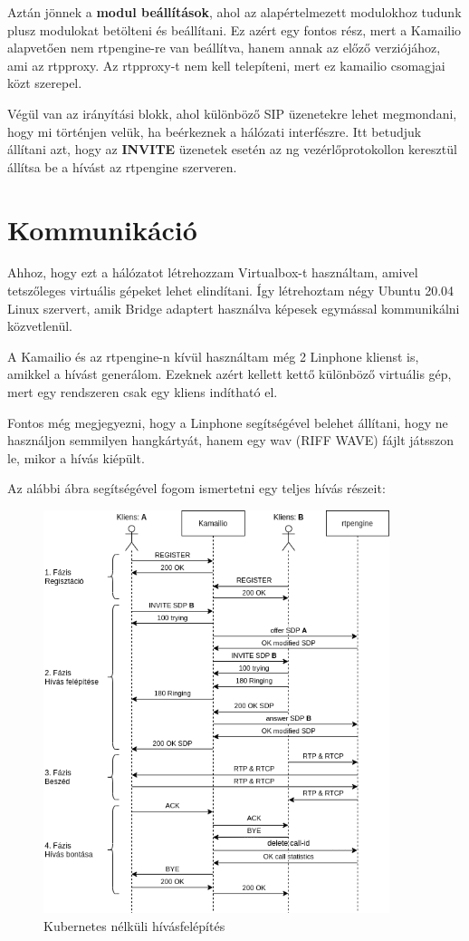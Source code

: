 Aztán jönnek a \textbf{modul beállítások}, ahol az alapértelmezett modulokhoz tudunk plusz
modulokat betölteni és beállítani. Ez azért egy fontos rész, mert a Kamailio alapvetően 
nem rtpengine-re van beállítva, hanem annak az előző verziójához, ami az rtpproxy. 
Az rtpproxy-t nem kell telepíteni, mert ez kamailio csomagjai közt szerepel. 

Végül van az irányítási blokk, ahol különböző SIP üzenetekre lehet megmondani, hogy mi
történjen velük, ha beérkeznek a hálózati interfészre. Itt betudjuk állítani azt, hogy
az \textbf{INVITE} üzenetek esetén az ng vezérlőprotokollon keresztül állítsa be a hívást
az rtpengine szerveren.

\section{Kommunikáció}

Ahhoz, hogy ezt a hálózatot létrehozzam Virtualbox-t használtam, amivel tetszőleges 
virtuális gépeket lehet elindítani. Így létrehoztam négy Ubuntu 20.04 Linux szervert, amik
Bridge adaptert használva képesek egymással kommunikálni közvetlenül. 

A Kamailio és az rtpengine-n kívül használtam még 2 Linphone klienst is, amikkel a hívást
generálom. Ezeknek azért kellett kettő különböző virtuális gép, mert egy rendszeren 
csak egy kliens indítható el.

Fontos még megjegyezni, hogy a Linphone segítségével belehet állítani, hogy ne használjon
semmilyen hangkártyát, hanem egy wav (RIFF WAVE) fájlt játsszon le, mikor a hívás kiépült.

Az alábbi ábra segítségével fogom ismertetni egy teljes hívás részeit:

\begin{figure}[!ht]
	\centering
	\includegraphics[width=0.9\textwidth, keepaspectratio]{figures/basic_call_flow.png}
	\caption{Kubernetes nélküli hívásfelépítés}
	\label{fig:HVSpaces}
\end{figure}


